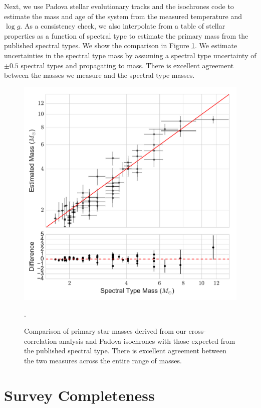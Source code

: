 \documentclass{emulateapj}
\begin{document}
Next, we use Padova stellar evolutionary tracks \citep{Bressan2012} and the isochrones code \citep{isochrones_code} to estimate the mass and age of the system from the measured temperature and $\log{g}$. As a consistency check, we also interpolate from a table of stellar properties as a function of spectral type \citep{Pecaut2013} to estimate the primary mass from the published spectral types. We show the comparison in Figure \ref{fig:prim_mass}. We estimate uncertainties in the spectral type mass by assuming a spectral type uncertainty of $\pm 0.5$ spectral types and propagating to mass. There is excellent agreement between the masses we measure and the spectral type masses.

\begin{figure}
\includegraphics[width=\columnwidth]{PrimaryMassEstimates_log.pdf}
\caption{Comparison of primary star masses derived from our cross-correlation analysis and Padova isochrones \citep{Bressan2012} with those expected from the published spectral type. There is excellent agreement between the two measures across the entire range of masses.}
\label{fig:prim_mass}.
\end{figure}





\section{Survey Completeness}
\label{sec:completeness}
\end{document}
